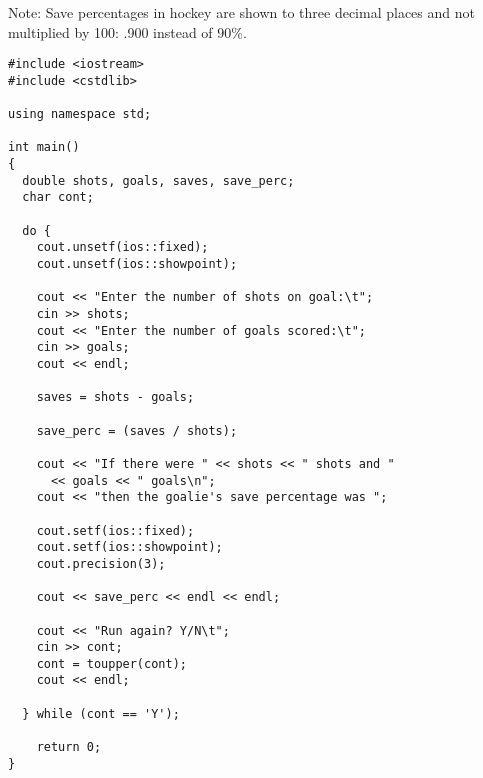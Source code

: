 \begin{enumerate}
Note: Save percentages in hockey are shown to three decimal places and not multiplied by 100: .900 instead of 90\%. \nopagebreak[4]

\noindent\begin{minipage}{\linewidth}\begin{lstlisting}
#include <iostream>
#include <cstdlib>

using namespace std;

int main()
{
  double shots, goals, saves, save_perc;
  char cont;

  do {
    cout.unsetf(ios::fixed);
    cout.unsetf(ios::showpoint);

    cout << "Enter the number of shots on goal:\t";
    cin >> shots;
    cout << "Enter the number of goals scored:\t";
    cin >> goals;
    cout << endl;

    saves = shots - goals;

    save_perc = (saves / shots);

    cout << "If there were " << shots << " shots and " 
      << goals << " goals\n";
    cout << "then the goalie's save percentage was ";

    cout.setf(ios::fixed);
    cout.setf(ios::showpoint);
    cout.precision(3);

    cout << save_perc << endl << endl;

    cout << "Run again? Y/N\t";
    cin >> cont;
    cont = toupper(cont);
    cout << endl;

  } while (cont == 'Y');

    return 0;
}
\end{lstlisting}\end{minipage}

\end{enumerate}

%

